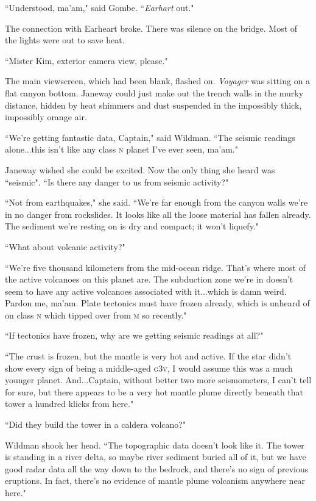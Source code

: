 \documentclass[twoside,letterpaper,12pt]{memoir}
\begin{document}
``Understood, ma'am," said Gombe. ``\textit{Earhart} out."

The connection with Earheart broke. There was silence on the bridge. Most of the lights were out to save heat.

``Mister Kim, exterior camera view, please."

The main viewscreen, which had been blank, flashed on. \textit{Voyager} was sitting on a flat canyon bottom. Janeway could just make out the trench walls in the murky distance, hidden by heat shimmers and dust suspended in the impossibly thick, impossibly orange air.

``We're getting fantastic data, Captain," said Wildman. ``The seismic readings alone...this isn't like any class \textsc{n} planet I've ever seen, ma'am."

Janeway wished she could be excited. Now the only thing she heard was ``seismic". ``Is there any danger to us from seismic activity?"

``Not from earthquakes," she said. ``We're far enough from the canyon walls we're in no danger from rockslides. It looks like all the loose material has fallen already. The sediment we're resting on is dry and compact; it won't liquefy."

``What about volcanic activity?"

``We're five thousand kilometers from the mid-ocean ridge. That's where most of the active volcanoes on this planet are. The subduction zone we're in doesn't seem to have any active volcanoes associated with it...which is damn weird. Pardon me, ma'am. Plate tectonics must have frozen already, which is unheard of on class \textsc{n} which tipped over from \textsc{m} so recently."

``If tectonics have frozen, why are we getting seismic readings at all?"

``The crust is frozen, but the mantle is very hot and active. If the star didn't show every sign of being a middle-aged \textsc{g3v}, I would assume this was a much younger planet. And...Captain, without better two more seismometers, I can't tell for sure, but there appears to be a very hot mantle plume directly beneath that tower a hundred klicks from here."

``Did they build the tower in a caldera volcano?"

Wildman shook her head. ``The topographic data doesn't look like it. The tower is standing in a river delta, so maybe river sediment buried all of it, but we have good radar data all the way down to the bedrock, and there's no sign of previous eruptions. In fact, there's no evidence of mantle plume volcanism anywhere near here."
\end{document}
